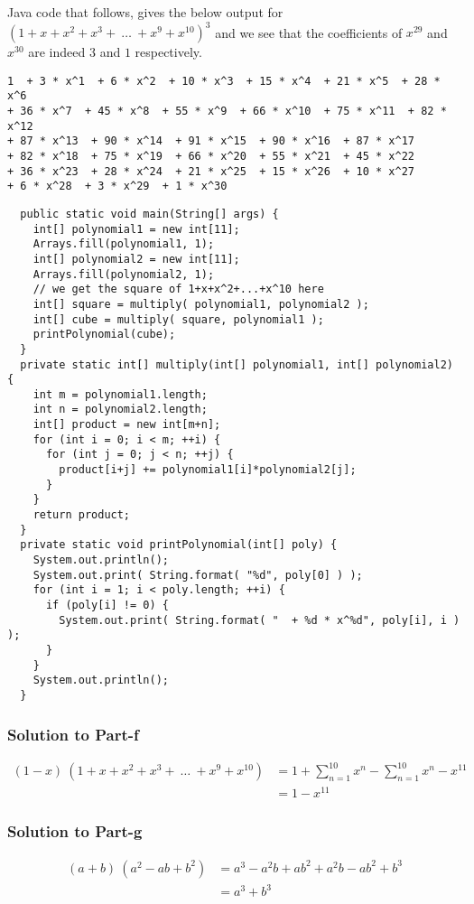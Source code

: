 \documentclass[12pt]{article}
\begin{document}
Java code that follows, gives the below output for \\$\left( 1+x+x^2+x^3+\ \ldots\ +x^9+x^{10} \right)^3$ and we see that the coefficients of $x^{29}$ and $x^{30}$ are indeed $3$ and $1$ respectively. 

\begin{verbatim}
1  + 3 * x^1  + 6 * x^2  + 10 * x^3  + 15 * x^4  + 21 * x^5  + 28 * x^6  
+ 36 * x^7  + 45 * x^8  + 55 * x^9  + 66 * x^10  + 75 * x^11  + 82 * x^12  
+ 87 * x^13  + 90 * x^14  + 91 * x^15  + 90 * x^16  + 87 * x^17  
+ 82 * x^18  + 75 * x^19  + 66 * x^20  + 55 * x^21  + 45 * x^22  
+ 36 * x^23  + 28 * x^24  + 21 * x^25  + 15 * x^26  + 10 * x^27  
+ 6 * x^28  + 3 * x^29  + 1 * x^30
\end{verbatim}
\begin{verbatim}
  public static void main(String[] args) {
    int[] polynomial1 = new int[11];
    Arrays.fill(polynomial1, 1); 
    int[] polynomial2 = new int[11];
    Arrays.fill(polynomial2, 1);
    // we get the square of 1+x+x^2+...+x^10 here
    int[] square = multiply( polynomial1, polynomial2 );
    int[] cube = multiply( square, polynomial1 );
    printPolynomial(cube);
  }
  private static int[] multiply(int[] polynomial1, int[] polynomial2) {
    int m = polynomial1.length;
    int n = polynomial2.length;
    int[] product = new int[m+n];
    for (int i = 0; i < m; ++i) {
      for (int j = 0; j < n; ++j) {
        product[i+j] += polynomial1[i]*polynomial2[j];
      }
    }
    return product;
  }
  private static void printPolynomial(int[] poly) {
    System.out.println();
    System.out.print( String.format( "%d", poly[0] ) );
    for (int i = 1; i < poly.length; ++i) {
      if (poly[i] != 0) {
        System.out.print( String.format( "  + %d * x^%d", poly[i], i ) );
      }
    }
    System.out.println();
  }
\end{verbatim}

\subsubsection*{Solution to Part-f}
\begin{displaymath}
\begin{split}
(1-x)\ \left( 1+x+x^2+x^3+\ \ldots\ +x^9+x^{10} \right) &= 1+\sum_{n=1}^{10}x^n-\sum_{n=1}^{10}x^n-x^{11}\\
														&= 1-x^{11}
\end{split}
\end{displaymath}

\subsubsection*{Solution to Part-g}
\begin{displaymath}
	\begin{split}
		(a+b)\ \left( a^2 - ab + b^2 \right) &= a^3 -a^2b+ab^2+a^2b-ab^2+b^3\\
											 &= a^3+b^3
	\end{split}
\end{displaymath}
\end{document}

